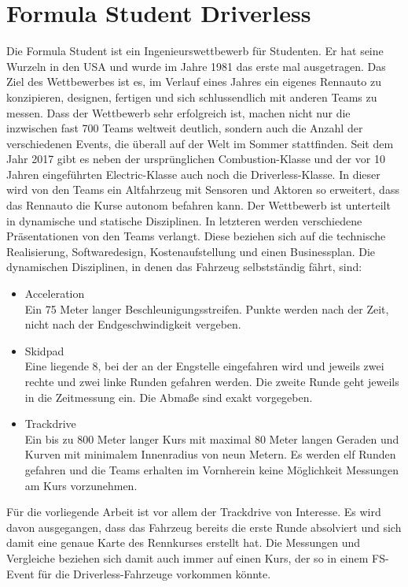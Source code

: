 \documentclass{like}
\begin{document}
\section{Formula Student Driverless}
Die Formula Student ist ein Ingenieurswettbewerb für Studenten. Er hat seine Wurzeln in den USA und wurde im Jahre 1981 das erste mal ausgetragen. Das Ziel des Wettbewerbes ist es, im Verlauf eines Jahres ein eigenes Rennauto zu konzipieren, designen, fertigen und sich schlussendlich mit anderen Teams zu messen. Dass der Wettbewerb sehr erfolgreich ist, machen nicht nur die inzwischen fast 700 Teams weltweit \cite{FsWorldRank:1} deutlich, sondern auch die Anzahl der verschiedenen Events, die überall auf der Welt im Sommer stattfinden. Seit dem Jahr 2017 gibt es neben der ursprünglichen Combustion-Klasse und der vor 10 Jahren eingeführten Electric-Klasse auch noch die Driverless-Klasse.
In dieser wird von den Teams ein Altfahrzeug mit Sensoren und Aktoren so erweitert, dass das Rennauto die Kurse autonom befahren kann.
Der Wettbewerb ist unterteilt in dynamische und statische Disziplinen. In letzteren werden verschiedene Präsentationen von den Teams verlangt. Diese beziehen sich auf die technische Realisierung, Softwaredesign, Kostenaufstellung und einen Businessplan.
Die dynamischen Disziplinen, in denen das Fahrzeug selbstständig fährt, sind:
\begin{itemize}
	\item Acceleration \\ Ein 75 Meter langer Beschleunigungsstreifen. Punkte werden nach der Zeit, nicht nach der Endgeschwindigkeit vergeben.
	\item Skidpad \\ Eine liegende 8, bei der an der Engstelle eingefahren wird und jeweils zwei rechte und zwei linke Runden gefahren werden. Die zweite Runde geht jeweils in die Zeitmessung ein. Die Abmaße sind exakt vorgegeben.
	\item Trackdrive \\ Ein bis zu 800 Meter langer Kurs mit maximal 80 Meter langen Geraden und Kurven mit minimalem Innenradius von neun Metern. Es werden elf Runden gefahren und die Teams erhalten im Vornherein keine Möglichkeit Messungen am Kurs vorzunehmen.
\end{itemize}

Für die vorliegende Arbeit ist vor allem der Trackdrive von Interesse. Es wird davon ausgegangen, dass das Fahrzeug bereits die erste Runde absolviert und sich damit eine genaue Karte des Rennkurses erstellt hat. Die Messungen und Vergleiche beziehen sich damit auch immer auf einen Kurs, der so in einem \ac{FS}-Event für die Driverless-Fahrzeuge vorkommen könnte.
\end{document}

